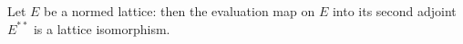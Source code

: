 Let $E$ be a normed lattice: then the evaluation map on $E$ into its second adjoint $E^{**}$ is a lattice isomorphism.
